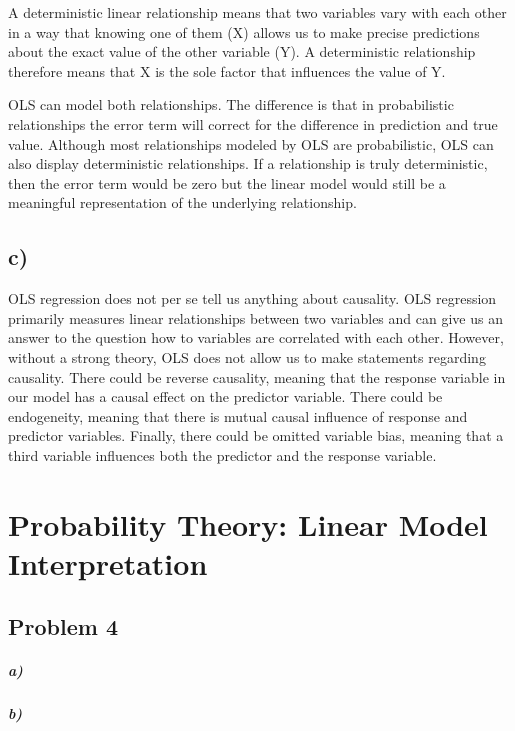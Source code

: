 \documentclass[12pt,letter]{article}\usepackage[]{graphicx}\usepackage[]{color}
\begin{document}
A deterministic linear relationship means that two variables vary with each other in a way that knowing one of them (X) allows us to make precise predictions about the exact value of the other variable (Y). A deterministic relationship therefore means that X is the sole factor that influences the value of Y.

OLS can model both relationships. The difference is that in probabilistic relationships the error term will correct for the difference in prediction and true value. Although most relationships modeled by OLS are probabilistic, OLS can also display deterministic relationships. If a relationship is truly deterministic, then the error term would be zero but the linear model would still be a meaningful representation of the underlying relationship.

\subsection{c)} OLS regression does not per se tell us anything about causality. OLS regression primarily measures linear relationships between two variables and can give us an answer to the question how to variables are correlated with each other. However, without a strong theory, OLS does not allow us to make statements regarding causality. There could be reverse causality, meaning that the response variable in our model has a causal effect on the predictor variable. There could be endogeneity, meaning that there is mutual causal influence of response and predictor variables. Finally, there could be omitted variable bias, meaning that a third variable influences both the predictor and the response variable.



\section*{Probability Theory: Linear Model Interpretation}

\subsection*{Problem 4}

\subparagraph{a)} 

\subparagraph{b)}
\end{document}
